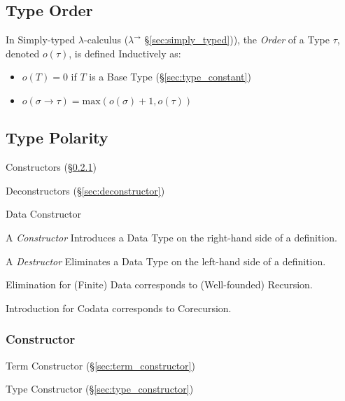 \subsection{Type Order}\label{sec:type_order}

In Simply-typed $\lambda$-calculus ($\lambda^\rightarrow$
\S\ref{sec:simply_typed})), the \emph{Order} of a Type $\tau$, denoted
$o(\tau)$, is defined Inductively as:
\begin{itemize}
\item $o(T) = 0$ if $T$ is a Base Type (\S\ref{sec:type_constant})
\item $o(\sigma \rightarrow \tau) = \text{max}(o(\sigma) + 1,
  o(\tau))$
\end{itemize}



\subsection{Type Polarity}\label{sec:type_polarity}

Constructors (\S\ref{sec:constructor})

Deconstructors (\S\ref{sec:deconstructor})


\asterism


Data Constructor

A \emph{Constructor} Introduces a Data Type on the right-hand side of
a definition.

A \emph{Destructor} Eliminates a Data Type on the left-hand side of a
definition.

Elimination for (Finite) Data corresponds to (Well-founded)
Recursion.

Introduction for Codata corresponds to Corecursion.




\subsubsection{Constructor}\label{sec:constructor}

Term Constructor (\S\ref{sec:term_constructor})

Type Constructor (\S\ref{sec:type_constructor})



